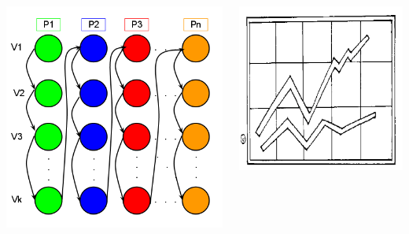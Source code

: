 \documentclass[final]{beamer}
\begin{document}
\begin{frame}[t]
\begin{columns}[t]
\begin{column}{0.60\paperwidth}
\begin{columns}[t,totalwidth=0.60\paperwidth]
\begin{column}{0.28\paperwidth}
\begin{columns}[t,totalwidth=0.28\paperwidth]
\begin{column}{0.12\paperwidth}
								\begin{center} \includegraphics[width=0.12\paperwidth]{img/linked_list/seq_node_seq_proc} \end{center}
							\end{column}
							\begin{column}{0.12\paperwidth}
								\begin{center} \includegraphics[width=0.12\paperwidth]{img/temp} \end{center}
							\end{column}
						\end{columns}
					\end{column}

\end{columns}
\end{column}
\end{columns}
\end{frame}
\end{document}

